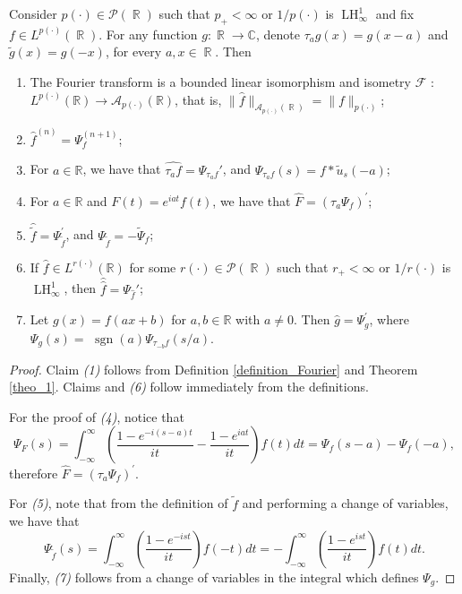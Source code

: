 \documentclass[10pt,a4paper]{amsart}
\DeclareMathOperator{\R}{\mathbb{R}}
\newcommand{\LH}{\operatorname{LH}_\infty^1}
\newcommand{\Lp}{L^{\p}(\R)}
\newcommand{\p}{p(\cdot)}
\begin{document}
\begin{prop}\label{prop_properties}
    Consider $\p\in\mathcal{P}(\R)$ such that $p_{+}<\infty$ or $1/\p$ is $\LH$ and fix  $f\in\Lp$. For any function $g:\R\to\mathbb{C}$, denote $\tau_ag(x)=g(x-a)$ and $\tilde{g}(x)=g(-x)$, for every $a,x\in\R$. Then
    \begin{enumerate}
               \item  The Fourier transform is a bounded linear isomorphism and isometry $\mathcal{F}$ : $L^{\p}(\mathbb{R}) \to \mathcal{A}_{\p}(\mathbb{R})$, that is, $\|\hat{f}\|_{\mathcal{A}_{\p}(\R)}=\|f\|_{\p}$;

\item $\hat{f}^{(n)}=\Psi_f^{(n+1)}$;
\item For $a \in \mathbb{R}$, we have that  $\widehat{\tau_a f}=\Psi_{\tau_a f}'$, and $\Psi_{\tau_a f}(s)=f * \tilde{u}_s(-a)$;
\item For $a \in \mathbb{R}$ and $F(t)={e}^{{i} a t} f(t)$, we have that $\widehat{F}=\left(\tau_a \Psi_f\right)^{\prime}$;
\item $\hat{\tilde{f}}=\Psi_{\tilde{f}}^{\prime}$, and $\Psi_{\tilde{f}}=-\widetilde{\Psi}_f$;
\item If $\hat{f} \in L^{r(\cdot)}(\mathbb{R})$ for some $r(\cdot)\in \mathcal{P}(\R)$ such that $r_{+}<\infty$ or $1/r(\cdot)$ is $\LH$, then $\hat{\hat{f}}=\Psi_{\widehat{f}}'$;
\item Let $g(x)=f(a x+b)$ for $a, b \in \mathbb{R}$ with $a \neq 0$. Then $\hat{g}=\Psi_g^{\prime}$, where $\Psi_g(s)=$ $\operatorname{sgn}(a) \Psi_{\tau_{-b} f}(s / a)$.
    \end{enumerate}
\end{prop}

\begin{proof}
    Claim {\it (1)} follows from Definition \ref{definition_Fourier} and Theorem \ref{theo_1}.
Claims  and {\it (6)} 
follow immediately from the definitions.

\noindent For the proof of {\it (4)}, notice that
$$
\Psi_F(s)=\int_{-\infty}^{\infty}\left(\frac{1-{e}^{-{i}(s-a) t}}{{i} t}-\frac{1-{e}^{{i} a t}}{{i} t}\right) f(t) {d} t=\Psi_f(s-a)-\Psi_f(-a),
$$
therefore $\widehat{F}=\left(\tau_a \Psi_f\right)^{\prime}$.

\noindent For {\it (5)}, note that from the definition of $\tilde{f}$ and performing a change of variables, we have that
$$
\Psi_{\tilde{f}}(s)=\int_{-\infty}^{\infty}\left(\frac{1-{e}^{-{i} s t}}{{i} t}\right) f(-t) {d} t=-\int_{-\infty}^{\infty}\left(\frac{1-{e}^{{i} s t}}{{i} t}\right) f(t) {d} t.
$$
\noindent Finally, {\it (7)} follows from a change of variables in the integral which defines $\Psi_g$.
\end{proof}
\end{document}
